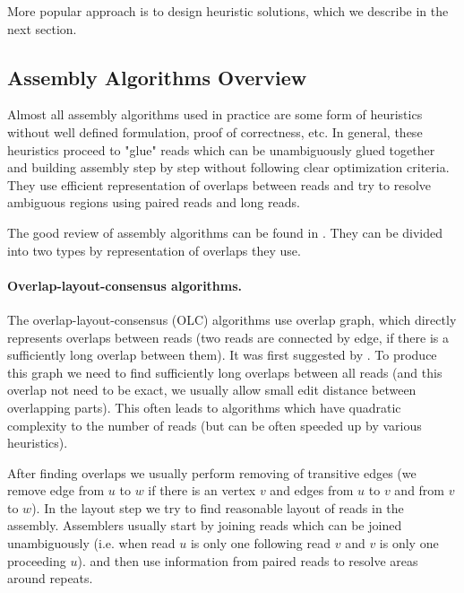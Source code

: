More popular approach is to design heuristic solutions, which we describe in the next
section.

\subsection{Assembly Algorithms Overview}

Almost all assembly algorithms used in practice are some form of heuristics
without well defined formulation, proof of correctness, etc.
In general, these heuristics proceed to "glue" reads which can be
unambiguously glued together and building assembly step by step
without following clear optimization criteria.
They use efficient representation of overlaps between reads and try to resolve
ambiguous regions using paired reads and long reads.

The good review of assembly algorithms can be found in \citet{miller2010assembly}.
They can be divided into two types by representation of overlaps they use.

\paragraph{Overlap-layout-consensus algorithms.}
The overlap-layout-consensus (OLC) algorithms use overlap graph, which directly represents
overlaps between reads (two reads are connected by edge, if there is a sufficiently long overlap between them). It was first suggested by \citet{myers1995toward}.
To produce this graph we need to find sufficiently long
overlaps between all reads (and this overlap not need to be exact, we usually allow small edit distance between overlapping parts). This often leads to algorithms which have quadratic
complexity to the number of reads (but can be often speeded up by various heuristics).

After finding overlaps we usually perform removing of transitive edges (we remove edge
from $u$ to $w$ if there is an vertex $v$ and edges from $u$ to $v$ and from $v$ to $w$).
In the layout step we try to find reasonable layout of reads in the assembly.
Assemblers usually start by joining reads which can be joined unambiguously (i.e.
when read $u$ is only one following read $v$ and $v$ is only one proceeding $u$).
and then use information from paired reads to resolve areas around repeats.

